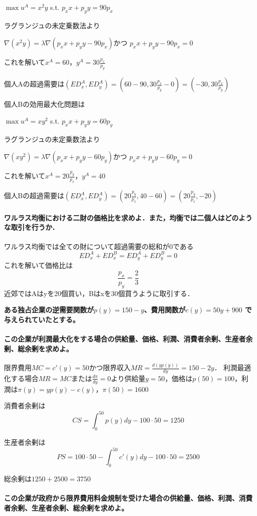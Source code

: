 \documentclass{jsarticle}
\begin{document}
$\max u^A=x^2y$ s.t. $p_x x+p_y y= 90 p_x$

ラグランジュの未定乗数法より

$\nabla (x^2 y)=\lambda \nabla (p_x x+p_y y - 90 p_x)$かつ
$p_x x+p_y y - 90 p_x=0$

これを解いて$x^A=60$，$y^A=30\frac{p_x}{p_y}$

個人Aの超過需要は$(ED_x^A,ED_y^A)=(60-90,30\frac{p_x}{p_y}-0)=(-30,30\frac{p_x}{p_y})$

個人Bの効用最大化問題は

$\max u^A=xy^2$ s.t. $p_x x+p_y y= 60 p_y$

ラグランジュの未定乗数法より

$\nabla (xy^2)=\lambda \nabla (p_x x+p_y y - 60 p_y)$かつ
$p_x x+p_y y - 60 p_y=0$

これを解いて$x^A=20\frac{p_y}{p_x}$，$y^A=40$

個人Bの超過需要は$(ED_x^A,ED_y^A)=(20\frac{p_y}{p_x},40-60)=(20\frac{p_y}{p_x},-20)$

\paragraph{ワルラス均衡における二財の価格比を求めよ．また，均衡では二個人はどのような取引を行うか．}

ワルラス均衡では全ての財について超過需要の総和が0である
$$ED_x^A+ED_x^B=ED_y^A+ED_y^B=0$$
これを解いて価格比は
$$\frac{p_x}{p_y}=\frac{2}{3}$$
近郊ではAはyを20個買い，Bはxを30個買うように取引する．

\textbf{ある独占企業の逆需要関数が$p(y)=150-y$、費用関数が$c(y)=50y+900$ で与えられていたとする。}

\paragraph{この企業が利潤最大化をする場合の供給量、価格、利潤、消費者余剰、生産者余剰、総余剰を求めよ。}

限界費用$MC=c'(y)=50$かつ限界収入$MR=\frac{d(yp(y))}{dy}=150-2y$．
利潤最適化する場合$MR=MC$または$\frac{d\pi}{dy}=0$より供給量$y=50$，価格は$p(50)=100$，利潤は$\pi(y)=yp(y)-c(y)$，$\pi(50)=1600$

消費者余剰は$$CS=\int_0^{50} p(y) dy - 100\cdot 50=1250$$

生産者余剰は$$PS=100 \cdot 50 - \int_0^{50} c'(y) dy - 100\cdot 50=2500$$

総余剰は$1250+2500=3750$

\paragraph{この企業が政府から限界費用料金規制を受けた場合の供給量、価格、利潤、消費者余剰、生産者余剰、総余剰を求めよ。}
\end{document}
